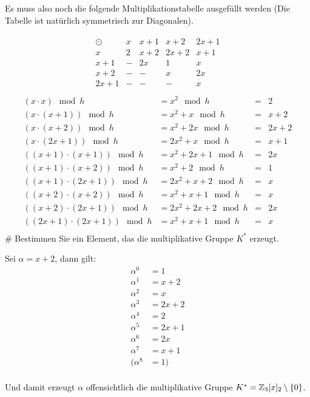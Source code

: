 \begin{myList}
Es muss also noch die folgende Multiplikationstabelle ausgefüllt werden (Die Tabelle ist natürlich symmetrisch zur Diagonalen).

\begin{align*}
	\begin{matrix}
	\odot & x & x+1 & x+2 & 2x+1  \\
	x & 2 & x+2 & 2x+2 & x+1   \\
	x+1 & - & 2x & 1 & x   \\
	x+2 & - & - & x & 2x   \\
	2x+1 & - & - & - & x   \\
	\end{matrix}
\end{align*}
\begin{align*}
	(x \cdot x) \mod h 			&= x^2 \mod h 			&=&  2\\ 
	(x \cdot (x+1)) \mod h 		&= x^2 + x \mod h 		&=& x+2\\
	(x \cdot (x+2)) \mod h 		&= x^2 + 2x \mod h 		&=& 2x+2\\
	(x \cdot (2x +1)) \mod h 	&= 2x^2 + x \mod h 		&=& x+1\\
	((x+1)\cdot (x+1)) \mod h 	&= x^2 + 2x + 1 \mod h 	&=& 2x\\
	((x+1)\cdot (x+2)) \mod h 	&= x^2 + 2 \mod h 		&=& 1\\
	((x+1)\cdot (2x+1)) \mod h 	&= 2x^2 + x + 2 \mod h 	&=& x\\
	((x+2)\cdot (x+2)) \mod h 	&= x^2 + x + 1 \mod h 	&=& x\\
	((x+2)\cdot (2x+1)) \mod h 	&= 2x^2 + 2x + 2 \mod h 	&=& 2x\\
	((2x+1)\cdot (2x+1)) \mod h 	&= x^2 + x + 1 \mod h 	&=& x\\
\end{align*}
#
Bestimmen Sie ein Element, das die multiplikative Gruppe $K^{\ast}$ erzeugt.\medskip

Sei $\alpha = x+2$, dann gilt:
\begin{align*}
	\alpha^0 &= 1 \\
	\alpha^1 &= x+2 \\
	\alpha^2 &= x \\
	\alpha^3 &= 2x+2 \\
	\alpha^4 &= 2 \\
	\alpha^5 &= 2x+1 \\
	\alpha^6 &= 2x \\
	\alpha^7 &= x+1 \\
	(\alpha^8 &= 1) \\
\end{align*}

Und damit erzeugt $\alpha$ offensichtlich die multiplikative Gruppe $K^\ast = \mathbb{Z}_3[x]_2 \setminus \lbrace 0\rbrace$.
\end{myList}


